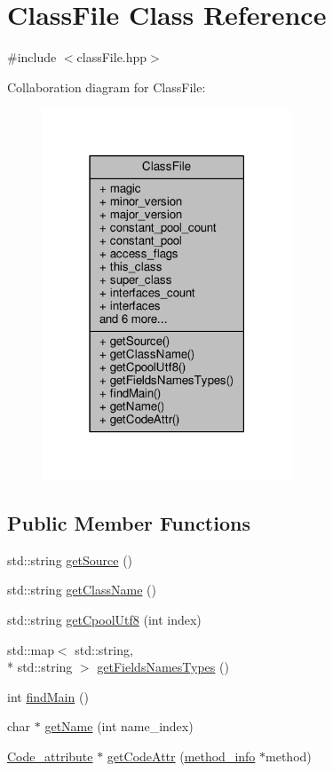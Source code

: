 \hypertarget{classClassFile}{\section{Class\+File Class Reference}
\label{classClassFile}
}


{\ttfamily \#include $<$class\+File.\+hpp$>$}



Collaboration diagram for Class\+File\+:\nopagebreak
\begin{figure}[H]
\begin{center}
\leavevmode
\includegraphics[width=210pt]{classClassFile__coll__graph}
\end{center}
\end{figure}
\subsection*{Public Member Functions}
\begin{DoxyCompactItemize}
\item 
std\+::string \hyperlink{classClassFile_a327e97890dd251532d064da9aa61deeb}{get\+Source} ()
\item 
std\+::string \hyperlink{classClassFile_a325315e2b9ccf9c10955467aae82b2a1}{get\+Class\+Name} ()
\item 
std\+::string \hyperlink{classClassFile_a917fdac173079a7eebacb22b728f295d}{get\+Cpool\+Utf8} (int index)
\item 
std\+::map$<$ std\+::string, \\*
std\+::string $>$ \hyperlink{classClassFile_aa791a7b86ab130ba6ba28d6d71f2c70c}{get\+Fields\+Names\+Types} ()
\item 
int \hyperlink{classClassFile_ab67b335ccd0e88ddb3b8ab99a602b8ea}{find\+Main} ()
\item 
char $\ast$ \hyperlink{classClassFile_a4d350fc2fcad87ab085c795adef1fe12}{get\+Name} (int name\+\_\+index)
\item 
\hyperlink{attributes_8hpp_ad1d2692bc09d9023430faad186e7647e}{Code\+\_\+attribute} $\ast$ \hyperlink{classClassFile_a3c6a5ced9d8616700fa2eef615489724}{get\+Code\+Attr} (\hyperlink{structs_8hpp_a6cbc7230791f4ca5e82816e58baeeacc}{method\+\_\+info} $\ast$method)
\end{DoxyCompactItemize}
